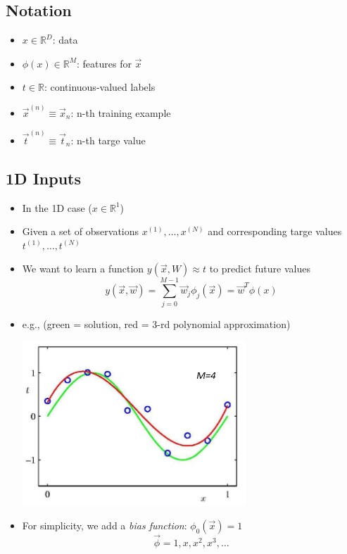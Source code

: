 \subsection{Notation}
\begin{itemize}
	\item $x\in\mathbb{R}^D$: data 
	\item $\phi (x)\in\mathbb{R}^M$: features for $\vec{x}$
	\item $t\in\mathbb{R}$: continuous-valued labels
	\item $\vec{x}^{(n)}\equiv \vec{x}_n$: n-th training example
	\item $\vec{t}^{(n)}\equiv \vec{t}_n$: n-th targe value
\end{itemize}

\subsection{1D Inputs}
\begin{itemize}
	\item In the 1D case ($x\in\mathbb{R}^1$)
	\item Given a set of observations $x^{(1)},\ldots ,x^{(N)}$ and corresponding targe values $t^{(1)},\ldots,t^{(N)}$
	\item We want to learn a function $y(\vec{x}, W)\approx t$ to predict future values
	$$y(\vec{x}, \vec{w})=\sum_{j=0}^{M-1}\vec{w}_j \phi_j (\vec{x}) = \vec{w}^T \phi(x)$$
	\item e.g., (green = solution, red = 3-rd polynomial approximation)
	\begin{center}
		\includegraphics{sections/lec2/3.png}
	\end{center}
	\item For simplicity, we add a \textit{bias function}: $\phi_0 (\vec{x})=1$
	$$\vec{\phi}=1, x, x^2, x^3, \ldots$$
\end{itemize}

